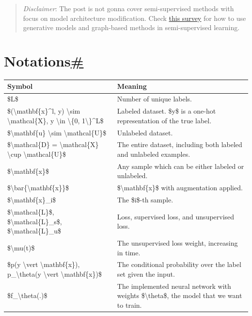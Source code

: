 \begin{quote}
\emph{Disclaimer}: The post is not gonna cover semi-supervised methods with focus on model architecture modification. Check \href{https://arxiv.org/abs/2006.05278}{this survey} for how to use generative models and graph-based methods in semi-supervised learning.
\end{quote}

\section{\texorpdfstring{Notations\hyperref[notations]{\#}}{Notations\#}}\label{notations}

\begin{longtable}[]{@{}ll@{}}
\toprule\noalign{}
Symbol & Meaning \\
\midrule\noalign{}
\endhead
\bottomrule\noalign{}
\endlastfoot
\$L\$ & Number of unique labels. \\
\$(\textbackslash mathbf\{x\}\^{}l, y) \textbackslash sim \textbackslash mathcal\{X\}, y \textbackslash in \textbackslash\{0, 1\textbackslash\}\^{}L\$ & Labeled dataset. \$y\$ is a one-hot representation of the true label. \\
\$\textbackslash mathbf\{u\} \textbackslash sim \textbackslash mathcal\{U\}\$ & Unlabeled dataset. \\
\$\textbackslash mathcal\{D\} = \textbackslash mathcal\{X\} \textbackslash cup \textbackslash mathcal\{U\}\$ & The entire dataset, including both labeled and unlabeled examples. \\
\$\textbackslash mathbf\{x\}\$ & Any sample which can be either labeled or unlabeled. \\
\$\textbackslash bar\{\textbackslash mathbf\{x\}\}\$ & \$\textbackslash mathbf\{x\}\$ with augmentation applied. \\
\$\textbackslash mathbf\{x\}\_i\$ & The \$i\$-th sample. \\
\$\textbackslash mathcal\{L\}\$, \$\textbackslash mathcal\{L\}\_s\$, \$\textbackslash mathcal\{L\}\_u\$ & Loss, supervised loss, and unsupervised loss. \\
\$\textbackslash mu(t)\$ & The unsupervised loss weight, increasing in time. \\
\$p(y \textbackslash vert \textbackslash mathbf\{x\}), p\_\textbackslash theta(y \textbackslash vert \textbackslash mathbf\{x\})\$ & The conditional probability over the label set given the input. \\
\$f\_\textbackslash theta(.)\$ & The implemented neural network with weights \$\textbackslash theta\$, the model that we want to train. \\

\end{longtable}
